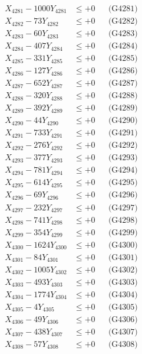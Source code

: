 \documentclass[a4paper,10pt]{article}
\begin{document}
{\begin{align}
\allowbreak
X_{4281} - 1000Y_{4281} &\leq +0 && \text{(G4281)} \\
X_{4282} - 73Y_{4282} &\leq +0 && \text{(G4282)} \\
X_{4283} - 60Y_{4283} &\leq +0 && \text{(G4283)} \\
X_{4284} - 407Y_{4284} &\leq +0 && \text{(G4284)} \\
X_{4285} - 331Y_{4285} &\leq +0 && \text{(G4285)} \\
X_{4286} - 127Y_{4286} &\leq +0 && \text{(G4286)} \\
X_{4287} - 652Y_{4287} &\leq +0 && \text{(G4287)} \\
X_{4288} - 320Y_{4288} &\leq +0 && \text{(G4288)} \\
X_{4289} - 392Y_{4289} &\leq +0 && \text{(G4289)} \\
X_{4290} - 44Y_{4290} &\leq +0 && \text{(G4290)} \\
\allowbreak
X_{4291} - 733Y_{4291} &\leq +0 && \text{(G4291)} \\
X_{4292} - 276Y_{4292} &\leq +0 && \text{(G4292)} \\
X_{4293} - 377Y_{4293} &\leq +0 && \text{(G4293)} \\
X_{4294} - 781Y_{4294} &\leq +0 && \text{(G4294)} \\
X_{4295} - 614Y_{4295} &\leq +0 && \text{(G4295)} \\
X_{4296} - 69Y_{4296} &\leq +0 && \text{(G4296)} \\
X_{4297} - 232Y_{4297} &\leq +0 && \text{(G4297)} \\
X_{4298} - 741Y_{4298} &\leq +0 && \text{(G4298)} \\
X_{4299} - 354Y_{4299} &\leq +0 && \text{(G4299)} \\
X_{4300} - 1624Y_{4300} &\leq +0 && \text{(G4300)} \\
\allowbreak
X_{4301} - 84Y_{4301} &\leq +0 && \text{(G4301)} \\
X_{4302} - 1005Y_{4302} &\leq +0 && \text{(G4302)} \\
X_{4303} - 493Y_{4303} &\leq +0 && \text{(G4303)} \\
X_{4304} - 1774Y_{4304} &\leq +0 && \text{(G4304)} \\
X_{4305} - 4Y_{4305} &\leq +0 && \text{(G4305)} \\
X_{4306} - 49Y_{4306} &\leq +0 && \text{(G4306)} \\
X_{4307} - 438Y_{4307} &\leq +0 && \text{(G4307)} \\
X_{4308} - 57Y_{4308} &\leq +0 && \text{(G4308)} \\

\end{align}}
\end{document}
